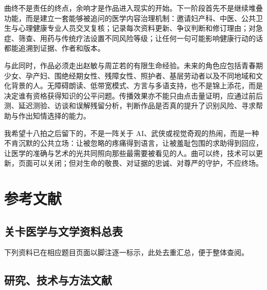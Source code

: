 \documentclass[lang=cn,a4paper,11pt,citestyle=gb7714-2015,bibstyle=gb7714-2015]{elegantpaper}
\begin{document}
曲终不是责任的终点，余响才是作品进入现实的开始。下一阶段首先不是继续堆叠功能，而是建立一套能够被追问的医学内容治理机制：邀请妇产科、中医、公共卫生与心理健康专业人员交叉复核；记录每次资料更新、争议判断和修订理由；对急症、筛查、用药与传统疗法设置不同风险等级；让任何一句可能影响健康行动的话都能追溯到证据、作者和版本。

与此同时，作品必须走出赵敏与周芷若的有限生命经验。未来的角色应包括青春期少女、孕产妇、围绝经期女性、残障女性、照护者、基层劳动者以及不同地域和文化背景的人。无障碍朗读、低带宽模式、方言与多语支持，也不是锦上添花，而是决定谁有资格获得知识的公平问题。传播效果亦不能只由点击量证明，应通过前后测、延迟测验、访谈和误解残留分析，判断作品是否真的提升了识别风险、寻求帮助与作出知情选择的能力。

我希望十八拍之后留下的，不是一阵关于 AI、武侠或视觉奇观的热闹，而是一种不肯沉默的公共立场：让被忽略的疼痛得到语言，让被羞耻包围的求助得到回应，让医学的准确与艺术的光共同照向那些最需要被看见的人。曲可以终，技术可以更新，页面可以关闭；但对生命的敬畏、对证据的忠诚、对尊严的守护，不应终场。

\clearpage
\section{参考文献}

\subsection{关卡医学与文学资料总表}

下列资料已在相应题目页面以脚注逐一标示，此处去重汇总，便于整体查阅。



\subsection{研究、技术与方法文献}

\printbibliography[heading=none]
\end{document}
